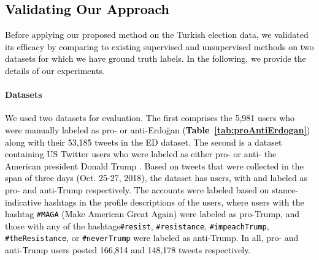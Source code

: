 \documentclass[letterpaper]{article} \usepackage{aaai20}  \usepackage{times}  \usepackage{stackengine}
\newcommand{\kareem}{\textcolor{black}}
\begin{document}
\kareem{\subsection{Validating Our Approach}}
\kareem{Before applying our proposed method on the Turkish election data, we validated its efficacy by comparing to existing supervised and unsupervised methods on two datasets for which we have ground truth labels. In the following, we provide the details of our experiments. }



\paragraph{Datasets}  
\kareem{We used two datasets for evaluation.  The first comprises the 5,981 users who were manually labeled as pro- or anti-Erdo\u{g}an (\textbf{Table~\ref{tab:proAntiErdogan}}) along with their 53,185 tweets in the ED dataset.  The second is a dataset containing US Twitter users who were labeled as either pro- or anti- the American president Donald Trump \citep{darwish2019unsupervisedStance}. Based on tweets that were collected in the span of three days (Oct. 25-27, 2018), the dataset has  users, with  and  labeled as pro- and anti-Trump respectively. The accounts were labeled based on stance-indicative hashtags in the profile descriptions of the users, where users with the hashtag \texttt{\#MAGA} (Make American Great Again) were labeled as pro-Trump, and those with any of the hashtags\texttt{\#resist}, \texttt{\#resistance}, \texttt{\#impeachTrump}, \texttt{\#theResistance}, or \texttt{\#neverTrump} were labeled as anti-Trump. In all, pro- and anti-Trump users posted 166,814 and 148,178 tweets respectively.}
\vspace{-6pt}
\end{document}
